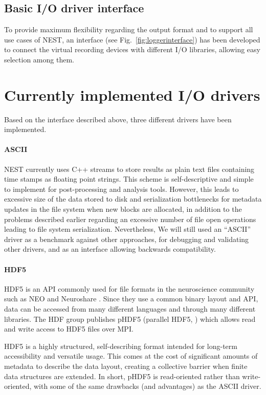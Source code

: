 \documentclass[]{YIC2015}
\begin{document}
\subsection{Basic I/O driver interface}

To provide maximum flexibility regarding the output format and to support all 
use cases of NEST, an interface (see Fig.~\ref{fig:loggerinterface})
has been developed to connect the virtual recording devices with different I/O 
libraries, allowing easy selection among them.


\section{Currently implemented I/O drivers}
\label{sec:io-drivers}

Based on the interface described above, three different drivers have been
implemented.

\paragraph{ASCII}

NEST currently uses C++ streams to store results as plain text files
containing time stamps as floating point strings. This scheme is
self-descriptive and simple to implement for post-processing and
analysis tools. However, this leads to excessive size of the data
stored to disk and serialization bottlenecks for metadata updates in
the file system when new blocks are allocated, in addition to the
problems described earlier regarding an excessive number of file open
operations leading to file system serialization. Nevertheless, We will
still used an ``ASCII'' driver as a benchmark against other
approaches, for debugging and validating other drivers, and as an
interface allowing backwards compatibility.

\paragraph{HDF5}

HDF5 is an API commonly used for file formats in the neuroscience
community such as NEO \cite{neo} and Neuroshare \cite{neuroshare}.
Since they use a common binary layout and API, data can be accessed
from many different languages and through many different libraries.
The HDF group publishes pHDF5 (parallel HDF5, \cite{hdf5}) which
allows read and write access to HDF5 files over MPI.

HDF5 is a highly structured, self-describing format intended for
long-term accessibility and versatile usage. This comes at the cost of
significant amounts of metadata to describe the data layout, creating
a collective barrier when finite data structures are extended. In
short, pHDF5 is read-oriented rather than write-oriented, with some of
the same drawbacks (and advantages) as the ASCII driver.
\end{document}
